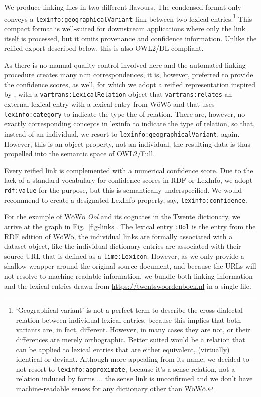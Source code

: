 \documentclass[11pt]{article}
\newcommand{\word}[1]{\textsl{#1}} %
\newcommand{\code}[1]{\texttt{#1}} %
\newcommand{\onto}[1]{\texttt{#1}} %
\begin{document}
We produce linking files in two different flavours. The condensed format only conveys a \onto{lexinfo:geographicalVariant} link between two lexical entries.\footnote{
    `Geographical variant' is not a perfect term to describe the cross-dialectal relation between individual lexical entries, because this implies that both variants are, in fact, different. However, in many cases they are not, or their differences are merely orthographic. Better suited would be a relation that can be applied to lexical entries that are either equivalent, (virtually) identical or deviant. 
    Although more appealing from its name, we decided to not resort to \onto{lexinfo:approximate}, because it's a sense relation, not a relation induced by forms ... the sense link is unconfirmed and we don't have machine-readable senses for any dictionary other than WöWö.
}
This compact format is well-suited for downstream applications where only the link itself is processed, but it omits provenance and confidence information. Unlike the reified export described below, this is also OWL2/DL-compliant. 

As there is no manual quality control involved here and the automated linking procedure creates many n:m correspondences, it is, however, preferred to provide the confidence scores, as well, for which we adopt a reified representation inspired by \citet{gillis2023refinement}, with a \code{vartrans:LexicalRelation} object that \code{vartrans:relates} an external lexical entry with a lexical entry from WöWö and that uses \code{lexinfo:category} to indicate the type the of relation. There are, however, no exactly corresponding concepts in lexinfo to indicate the type of relation, so that, instead of an individual, we resort to \onto{lexinfo:geographicalVariant}, again. However, this is an object property, not an individual, the resulting data is thus propelled into the semantic space of OWL2/Full.

Every reified link is complemented with a numerical confidence score. Due to the lack of a standard vocabulary for confidence scores in RDF or LexInfo, we adopt \onto{rdf:value} for the purpose, but this is semantically underspecified. We would recommend to create a designated LexInfo property, say, \onto{lexinfo:confidence}.

For the example of WöWö \word{Ool} and its cognates in the Twente dictionary, we arrive at the graph in Fig.\ \ref{fig-links}. The lexical entry \onto{:Ool} is the entry from the RDF edition of WöWö, the individual links are formally associated with a dataset object, like the individual dictionary entries are associated with their source URL that is defined as a \onto{lime:Lexicon}. However, as we only provide a shallow wrapper around the original source document, and because the URLs will not resolve to machine-readable information, we bundle both linking information and the lexical entries drawn from \url{https://twentswoordenboek.nl} in a single file.
\end{document}

